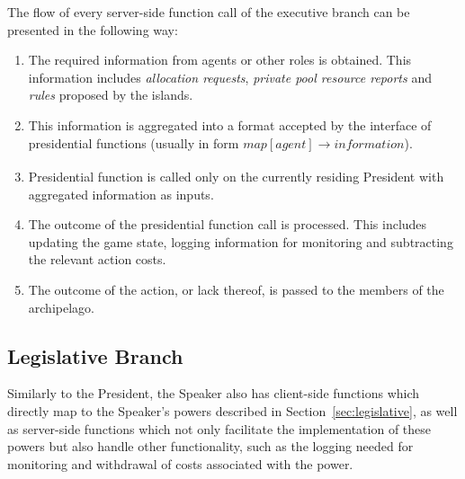 The flow of every server-side function call of the executive branch can be presented in the following way:
\begin{enumerate}
    \item The required information from agents or other roles is obtained. This information includes \emph{allocation requests}, \emph{private pool resource reports} and \emph{rules} proposed by the islands.
    \item This information is aggregated into a format accepted by the interface of presidential functions (usually in form $map[agent] \xrightarrow[]{} information$).
    \item Presidential function is called only on the currently residing President with aggregated information as inputs.
    \item The outcome of the presidential function call is processed. This includes updating the game state, logging information for monitoring and subtracting the relevant action costs.
    \item The outcome of the action, or lack thereof, is passed to the members of the archipelago.
\end{enumerate}

\subsection{Legislative Branch}
Similarly to the President, the Speaker also has client-side functions which directly map to the Speaker's powers described in Section~\ref{sec:legislative}, as well as server-side functions which not only facilitate the implementation of these powers but also handle other functionality, such as the logging needed for monitoring and withdrawal of costs associated with the power.

